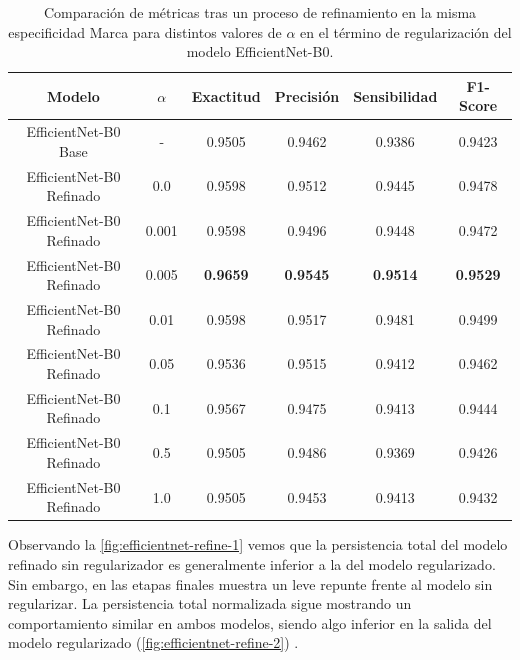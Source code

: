 \begin{table}[H]
	\centering
	\begin{adjustbox}
		{width=0.8\textwidth}
		\begin{tabular}{|c|c|c|c|c|c|}
			\hline
			\textbf{Modelo}          & $\alpha$ & \textbf{Exactitud} & \textbf{Precisión} & \textbf{Sensibilidad} & \textbf{F1-Score} \\
			\hline
			EfficientNet-B0 Base     & -        & 0.9505             & 0.9462             & 0.9386                & 0.9423            \\
			\hline
			EfficientNet-B0 Refinado & 0.0      & 0.9598             & 0.9512             & 0.9445                & 0.9478            \\
			\hline
			EfficientNet-B0 Refinado & 0.001    & 0.9598             & 0.9496             & 0.9448                & 0.9472            \\
			\hline
			EfficientNet-B0 Refinado & 0.005    & \textbf{0.9659}    & \textbf{0.9545}    & \textbf{0.9514}       & \textbf{0.9529}   \\
			\hline
			EfficientNet-B0 Refinado & 0.01     & 0.9598             & 0.9517             & 0.9481                & 0.9499            \\
			\hline
			EfficientNet-B0 Refinado & 0.05     & 0.9536             & 0.9515             & 0.9412                & 0.9462            \\
			\hline
			EfficientNet-B0 Refinado & 0.1      & 0.9567             & 0.9475             & 0.9413                & 0.9444            \\
			\hline
			EfficientNet-B0 Refinado & 0.5      & 0.9505             & 0.9486             & 0.9369                & 0.9426            \\
			\hline
			EfficientNet-B0 Refinado & 1.0      & 0.9505             & 0.9453             & 0.9413                & 0.9432            \\
			\hline
		\end{tabular}
	\end{adjustbox}
	\caption{Comparación de métricas tras un proceso de refinamiento en la misma
		especificidad Marca para distintos valores de $\alpha$ en el término de
		regularización del modelo EfficientNet-B0.}
	\label{tab:efficientnet-refined}
\end{table}

Observando la \autoref{fig:efficientnet-refine-1} vemos que la persistencia
total del modelo refinado sin regularizador es generalmente inferior a la del
modelo regularizado. Sin embargo, en las etapas finales muestra un leve repunte
frente al modelo sin regularizar. La persistencia total normalizada sigue mostrando
un comportamiento similar en ambos modelos, siendo algo inferior en la salida
del modelo regularizado (\autoref{fig:efficientnet-refine-2}) .

